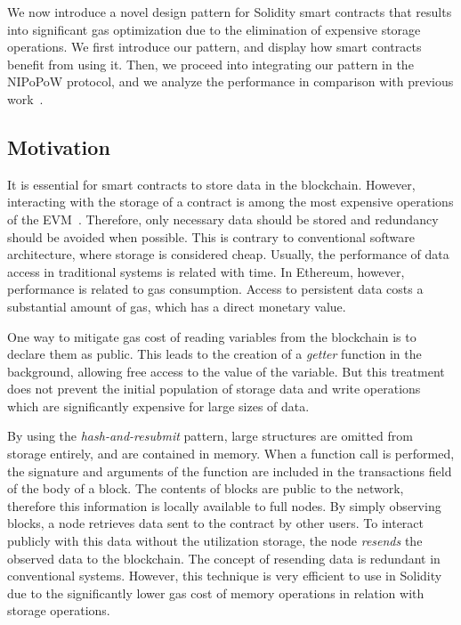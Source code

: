 We now introduce a novel design pattern for Solidity smart contracts that
results into significant gas optimization due to the elimination of expensive
storage operations. We first introduce our pattern, and display how smart
contracts benefit from using it. Then, we proceed into integrating our pattern
in the NIPoPoW protocol, and we analyze the performance in comparison with
previous work~\cite{gglou}.

\subsection{Motivation}
It is essential for smart contracts to store data in the blockchain. However,
interacting with the storage of a contract is among the most expensive
operations of the EVM~\cite{wood, buterin}. Therefore, only necessary data
should be stored and redundancy should be avoided when possible. This is
contrary to conventional software architecture, where storage is considered
cheap. Usually, the performance of data access in traditional systems is
related with time. In Ethereum, however, performance is related to gas
consumption. Access to persistent data costs a substantial amount of gas, which
has a direct monetary value.

One way to mitigate gas cost of reading variables
from the blockchain is to declare them as public. This leads to the creation of a
\emph{getter} function in the background, allowing free access to the value of
the variable. But this treatment does not prevent the initial population of
storage data and write operations which are significantly expensive for large
sizes of data.

By using the \emph{hash-and-resubmit} pattern, large structures are omitted
from storage entirely, and are contained in memory. When a function call is
performed, the signature and arguments of the function are included in the
transactions field of the body of a block. The contents of blocks are public to
the network, therefore this information is locally available to full nodes. By
simply observing blocks, a node retrieves data sent to the contract by other
users. To interact publicly with this data without the utilization storage, the
node \emph{resends} the observed data to the blockchain. The concept of
resending data is redundant in conventional systems. However, this technique
is very efficient to use in Solidity due to the significantly lower gas cost
of memory operations in relation with storage operations.

